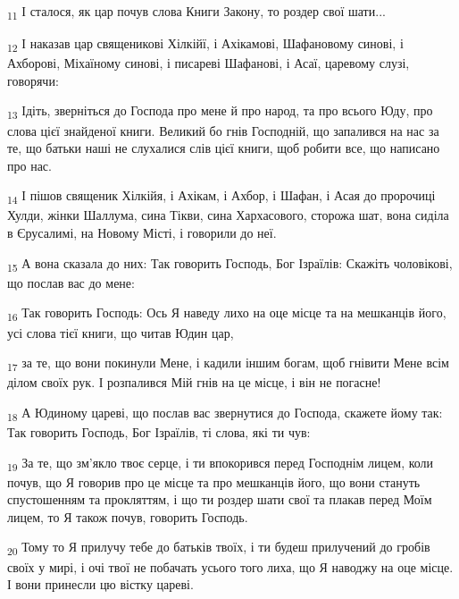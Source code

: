 \begin{tcolorbox}
\textsubscript{11} І сталося, як цар почув слова Книги Закону, то роздер свої шати...
\end{tcolorbox}
\begin{tcolorbox}
\textsubscript{12} І наказав цар священикові Хілкійї, і Ахікамові, Шафановому синові, і Ахборові, Міхаїному синові, і писареві Шафанові, і Асаї, царевому слузі, говорячи:
\end{tcolorbox}
\begin{tcolorbox}
\textsubscript{13} Ідіть, зверніться до Господа про мене й про народ, та про всього Юду, про слова цієї знайденої книги. Великий бо гнів Господній, що запалився на нас за те, що батьки наші не слухалися слів цієї книги, щоб робити все, що написано про нас.
\end{tcolorbox}
\begin{tcolorbox}
\textsubscript{14} І пішов священик Хілкійя, і Ахікам, і Ахбор, і Шафан, і Асая до пророчиці Хулди, жінки Шаллума, сина Тікви, сина Хархасового, сторожа шат, вона сиділа в Єрусалимі, на Новому Місті, і говорили до неї.
\end{tcolorbox}
\begin{tcolorbox}
\textsubscript{15} А вона сказала до них: Так говорить Господь, Бог Ізраїлів: Скажіть чоловікові, що послав вас до мене:
\end{tcolorbox}
\begin{tcolorbox}
\textsubscript{16} Так говорить Господь: Ось Я наведу лихо на оце місце та на мешканців його, усі слова тієї книги, що читав Юдин цар,
\end{tcolorbox}
\begin{tcolorbox}
\textsubscript{17} за те, що вони покинули Мене, і кадили іншим богам, щоб гнівити Мене всім ділом своїх рук. І розпалився Мій гнів на це місце, і він не погасне!
\end{tcolorbox}
\begin{tcolorbox}
\textsubscript{18} А Юдиному цареві, що послав вас звернутися до Господа, скажете йому так: Так говорить Господь, Бог Ізраїлів, ті слова, які ти чув:
\end{tcolorbox}
\begin{tcolorbox}
\textsubscript{19} За те, що зм'якло твоє серце, і ти впокорився перед Господнім лицем, коли почув, що Я говорив про це місце та про мешканців його, що вони стануть спустошенням та прокляттям, і що ти роздер шати свої та плакав перед Моїм лицем, то Я також почув, говорить Господь.
\end{tcolorbox}
\begin{tcolorbox}
\textsubscript{20} Тому то Я прилучу тебе до батьків твоїх, і ти будеш прилучений до гробів своїх у мирі, і очі твої не побачать усього того лиха, що Я наводжу на оце місце. І вони принесли цю вістку цареві.
\end{tcolorbox}

